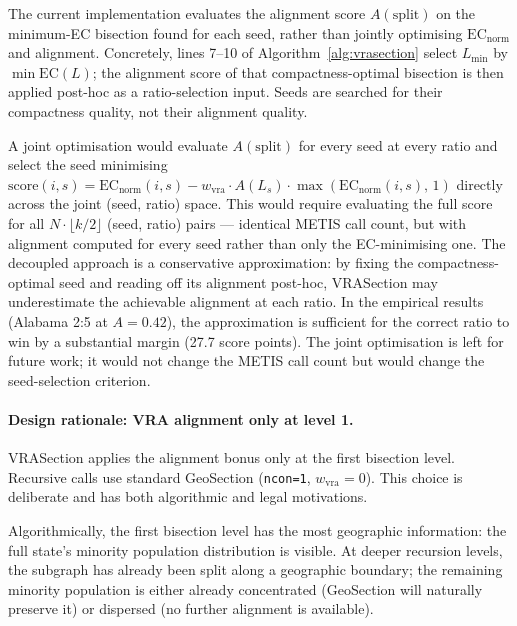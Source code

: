 \begin{remark}
\label{rem:decoupled}
The current implementation evaluates the alignment score $A(\mathrm{split})$
on the minimum-EC bisection found for each seed, rather than jointly
optimising $\mathrm{EC}_\text{norm}$ and alignment.
Concretely, lines 7--10 of Algorithm~\ref{alg:vrasection} select $L_{\min}$
by $\min \mathrm{EC}(L)$; the alignment score of that compactness-optimal
bisection is then applied post-hoc as a ratio-selection input.
Seeds are searched for their compactness quality, not their alignment quality.

A joint optimisation would evaluate $A(\mathrm{split})$ for every seed
at every ratio and select the seed minimising
$\mathrm{score}(i, s) = \mathrm{EC}_\text{norm}(i,s) - w_\text{vra}
\cdot A(L_s) \cdot \max(\mathrm{EC}_\text{norm}(i,s),\, 1)$
directly across the joint (seed, ratio) space.
This would require evaluating the full score for all $N \cdot \lfloor k/2 \rfloor$
(seed, ratio) pairs --- identical METIS call count, but with alignment
computed for every seed rather than only the EC-minimising one.
The decoupled approach is a conservative approximation: by fixing the
compactness-optimal seed and reading off its alignment post-hoc,
VRASection may underestimate the achievable alignment at each ratio.
In the empirical results (Alabama 2:5 at $A = 0.42$), the approximation
is sufficient for the correct ratio to win by a substantial margin (27.7
score points).
The joint optimisation is left for future work; it would not change the
METIS call count but would change the seed-selection criterion.
\end{remark}

\paragraph{Design rationale: VRA alignment only at level 1.}
VRASection applies the alignment bonus only at the first bisection level.
Recursive calls use standard GeoSection (\texttt{ncon=1}, $w_\text{vra}=0$).
This choice is deliberate and has both algorithmic and legal motivations.

Algorithmically, the first bisection level has the most geographic information:
the full state's minority population distribution is visible.
At deeper recursion levels, the subgraph has already been split along a
geographic boundary; the remaining minority population is either already
concentrated (GeoSection will naturally preserve it) or dispersed (no
further alignment is available).

